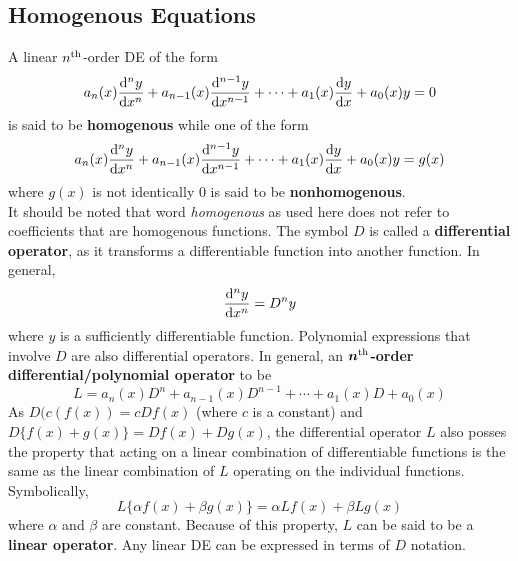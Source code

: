 \documentclass[./Differential Equations]{subfiles}
\begin{document}
		\subsection{Homogenous Equations}
			A linear \(n^{\text{th}}\)-order DE of the form
				\[a_n(x)\dv[n]{y}{x} + a_{n - 1}(x)\dv[n - 1]{y}{x} + \cdots + a_1(x)\dv{y}{x} + a_0(x)y = 0\]
				is said to be \textbf{homogenous} while one of the form
				\[a_n(x)\dv[n]{y}{x} + a_{n - 1}(x)\dv[n - 1]{y}{x} + \cdots + a_1(x)\dv{y}{x} + a_0(x)y = g(x)\]
				where \(g(x)\) is not identically 0 is said to be \textbf{nonhomogenous}. \\
			It should be noted that word \textit{homogenous} as used here does not refer to coefficients that are homogenous functions.
				The symbol \(D\) is called a \textbf{differential operator}, as it transforms a differentiable function into another function. In general,
					\[\dv[n]{y}{x} = D^ny\]
					where \(y\) is a sufficiently differentiable function. Polynomial expressions that involve \(D\) are also differential operators. In general, an \textbf{\(\bm{n^{\text{th}}}\)-order differential/polynomial operator} to be
					\[L = a_n(x)D^n + a_{n - 1}(x)D^{n - 1} + \cdots + a_1(x)D + a_0(x)\]
				As \(D(c(f(x)) = cDf(x)\) (where \(c\) is a constant) and \(D\{f(x) + g(x)\} = Df(x) + Dg(x)\), the differential operator \(L\) also posses the property that acting on a linear combination of differentiable functions is the same as the linear combination of \(L\) operating on the individual functions. Symbolically,
					\[L\{\alpha f(x) + \beta g(x)\} = \alpha Lf(x) + \beta Lg(x)\]
					where \(\alpha\) and \(\beta\) are constant. Because of this property, \(L\) can be said to be a \textbf{linear operator}.
				Any linear DE can be expressed in terms of \(D\) notation.
\end{document}
